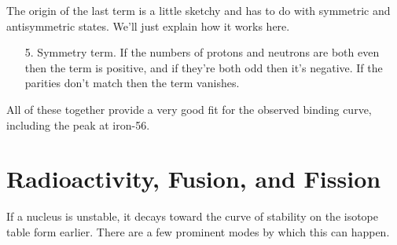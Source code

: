 \documentclass[../p052main.tex]{subfiles}
\begin{document}
The origin of the last term is a little sketchy and has to do with symmetric and antisymmetric states.
We'll just explain how it works here.
\begin{itemize}
    \item[5.] Symmetry term.
    If the numbers of protons and neutrons are both even then the term is positive, and if they're both odd then it's negative.
    If the parities don't match then the term vanishes.
\end{itemize}
All of these together provide a very good fit for the observed binding curve, including the peak at iron-56.

\section{Radioactivity, Fusion, and Fission}
If a nucleus is unstable, it decays toward the curve of stability on the isotope table form earlier.
There are a few prominent modes by which this can happen.
\end{document}

